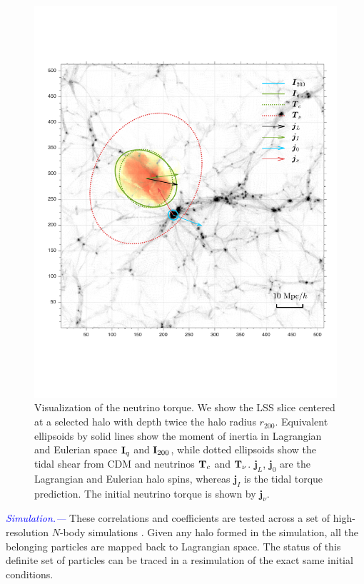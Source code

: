 \documentclass[aps,prd,twocolumn,amsmath,amssymb,amsfont,superscriptaddress]{revtex4-1}
\newcommand{\bs}{\boldsymbol}
\newcommand{\T}{\bold{T}}
\newcommand{\I}{\bold{I}}
\newcommand{\spin}{\bs{j}}
\newcommand{\tcb}{\textcolor{blue}}
\begin{document}
\begin{figure}
\centering
  \includegraphics[width=1\linewidth]{f1}
 \caption{Visualization of the neutrino torque. 
 We show the LSS slice centered at a selected halo with depth twice the halo radius $r_{200}$. 
 Equivalent ellipsoids by solid lines show the moment of inertia in Lagrangian and Eulerian space $\I_q$ and $\I_{200}$, 
 while dotted ellipsoids show the tidal shear from CDM and neutrinos $\T_c$ and $\T_\nu$. $\spin_L$, 
 $\spin_0$ are the Lagrangian and Eulerian halo spins, whereas $\spin_I$ is the tidal torque prediction. 
 The initial neutrino torque is shown by $\spin_\nu$.}\label{fig.1}
\end{figure}
\tcb{\textit{Simulation.---}}
These correlations and coefficients are tested across a set of high-resolution $N$-body simulations \citep{2018ApJS..237...24Y}. 
Given any halo formed in the simulation, all the belonging particles are mapped back to Lagrangian space. 
The status of this definite set of particles can be traced in a resimulation of the exact same initial conditions.
\end{document}
